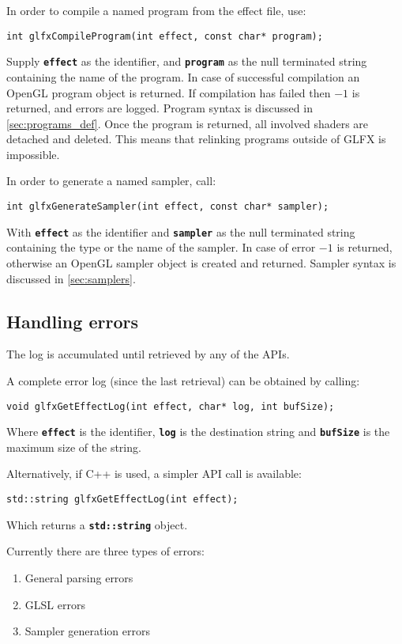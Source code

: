 \documentclass[11pt,a4paper,final,titlepage]{article}
\let\orgautoref\autoref
\renewcommand{\autoref}{%
\def\sectionautorefname{Sec.}%
\def\subsectionautorefname{Sec.}%
\def\algocflineautorefname{Alg.}%
\def\lemmaautorefname{Lemma}%
\orgautoref}
\begin{document}
In order to compile a named program from the effect file, use:

\begin{lstlisting}
int glfxCompileProgram(int effect, const char* program);
\end{lstlisting}
Supply \texttt{\textbf{effect}} as the identifier, and \texttt{\textbf{program}} as the null
terminated string containing the name of the program.
In case of successful compilation an OpenGL program object is returned. If compilation has failed
then $-1$ is returned, and errors are logged. Program syntax is discussed in \autoref{sec:programs_def}.
Once the program is returned, all involved shaders are detached and deleted. This means that relinking
programs outside of GLFX is impossible.

In order to generate a named sampler, call:

\begin{lstlisting}
int glfxGenerateSampler(int effect, const char* sampler);
\end{lstlisting}
With \texttt{\textbf{effect}} as the identifier and \texttt{\textbf{sampler}} as the null terminated
string containing the type or the name of the sampler.
In case of error $-1$ is returned, otherwise an OpenGL sampler object is created and returned.
Sampler syntax is discussed in \autoref{sec:samplers}.

\subsection{Handling errors}
The log is accumulated until retrieved by any of the APIs.

A complete error log (since the last retrieval) can be obtained by calling:
\begin{lstlisting}
void glfxGetEffectLog(int effect, char* log, int bufSize);
\end{lstlisting}
Where \texttt{\textbf{effect}} is the identifier, \texttt{\textbf{log}} is the destination
string and \texttt{\textbf{bufSize}} is the maximum size of the string.

Alternatively, if C++ is used, a simpler API call is available:
\begin{lstlisting}
std::string glfxGetEffectLog(int effect);
\end{lstlisting}
Which returns a \texttt{\textbf{std::string}} object.

Currently there are three types of errors:
\begin{enumerate}
\item General parsing errors
\item GLSL errors
\item Sampler generation errors
\end{enumerate}
\end{document}
